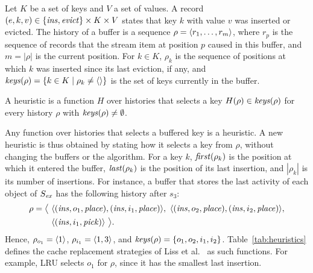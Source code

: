 \begin{definition}
\label{def:heuristic}
Let $K$ be a set of keys and $V$ a set of values.
A record $(e, k, v) \in \{\mathit{ins}, \mathit{evict}\} \times K \times V$
states that key $k$ with value $v$ was inserted or evicted.
The history of a buffer is a sequence $\rho = \langle r_1, \dots, r_m \rangle$, where
$r_p$ is the sequence of records that the stream item at position $p$ caused in
this buffer, and $m = |\rho|$ is the current position.
For $k \in K$, $\rho_k$ is the sequence of positions at which $k$ was inserted
since its last eviction, if any, and
$\mathit{keys}(\rho) = \{k \in K \mid \rho_k \neq \langle \rangle\}$ is the set of keys
currently in the buffer.

A heuristic is a function $H$ over histories that selects a key
$H(\rho) \in \mathit{keys}(\rho)$ for every history $\rho$ with
$\mathit{keys}(\rho) \neq \emptyset$.
\end{definition}

Any function over histories that selects a buffered key is a heuristic.
A new heuristic is thus obtained by stating how it selects a key from $\rho$,
without changing the buffers or the algorithm.
For a key $k$, $\mathit{first}(\rho_k)$ is the position at which it entered the
buffer, $\mathit{last}(\rho_k)$ is the position of its last insertion, and
$|\rho_k|$ is its number of insertions.
For instance, a buffer that stores the last activity of each object of
$S_{\mathit{ex}}$ has the following history after $s_3$:
\[
\begin{aligned}
  \rho = \bigl\langle\
  & \langle (\mathit{ins}, o_1, \mathit{place}), (\mathit{ins}, i_1, \mathit{place}) \rangle,\
    \langle (\mathit{ins}, o_2, \mathit{place}), (\mathit{ins}, i_2, \mathit{place}) \rangle,\\
  & \langle (\mathit{ins}, i_1, \mathit{pick}) \rangle\ \bigr\rangle.
\end{aligned}
\]
Hence, $\rho_{o_1} = \langle 1 \rangle$, $\rho_{i_1} = \langle 1, 3 \rangle$, and
$\mathit{keys}(\rho) = \{o_1, o_2, i_1, i_2\}$.
Table~\ref{tab:heuristics} defines the cache replacement strategies of Liss
et al.~\cite{Liss2025} as such functions.
For example, LRU selects $o_1$ for $\rho$, since it has the smallest last
insertion.

